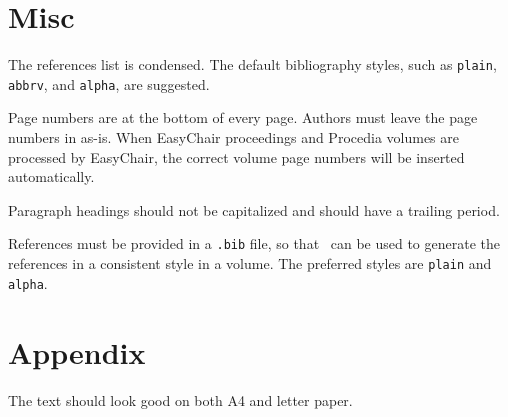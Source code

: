 \documentclass[a4paper]{easychair}
\begin{document}
\section{Misc}
\label{se:misc}

The references list is condensed. The default bibliography styles, such as
\texttt{plain}, \texttt{abbrv}, and \texttt{alpha}, are suggested.

Page numbers are at the bottom of every page. Authors must leave the
page numbers in as-is. When EasyChair proceedings and Procedia volumes are processed by
EasyChair, the correct volume page numbers will be inserted
automatically.

Paragraph headings should not be capitalized and should have a
trailing period. 

References must be provided in a {\tt .bib} file, so that \BibTeX\ can
be used to generate the references in a consistent style in a volume.
The preferred styles are {\tt plain} and {\tt alpha}.


%
%
%


\appendix
\section{Appendix}
\label{se:appendix}

The text should look good on both A4 and letter paper.


\end{document}
